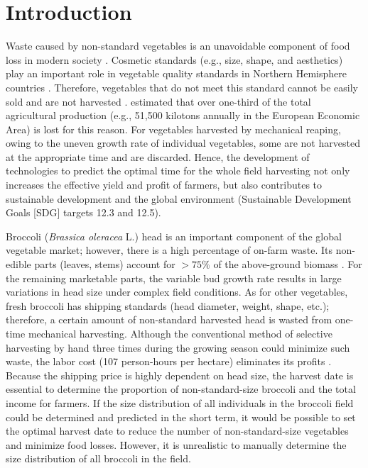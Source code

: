 \section{Introduction}

Waste caused by non-standard vegetables is an unavoidable component of food loss in modern society \citep{parfitt_food_2010,teuber_food_2016}. Cosmetic standards (e.g., size, shape, and aesthetics) play an important role in vegetable quality standards in Northern Hemisphere countries \citep{porter_avoidable_2018}. Therefore, vegetables that do not meet this standard cannot be easily sold and are not harvested \citep{garrone_opening_2014}. \citet{porter_avoidable_2018} estimated that over one-third of the total agricultural production (e.g., 51,500 kilotons annually in the European Economic Area) is lost for this reason. For vegetables harvested by mechanical reaping, owing to the uneven growth rate of individual vegetables, some are not harvested at the appropriate time and are discarded. Hence, the development of technologies to predict the optimal time for the whole field harvesting not only increases the effective yield and profit of farmers, but also contributes to sustainable development and the global environment (Sustainable Development Goals [SDG] targets 12.3 and 12.5).

Broccoli (\textit{Brassica oleracea} L.) head is an important component of the global vegetable market; however, there is a high percentage of on-farm waste. Its non-edible parts (leaves, stems) account for $> 75\%$ of the above-ground biomass \citep[Table~1]{fink_nitrogen_1999}. For the remaining marketable parts, the variable bud growth rate results in large variations in head size under complex field conditions. As for other vegetables, fresh broccoli has shipping standards (head diameter, weight, shape, etc.); therefore, a certain amount of non-standard harvested head is wasted from one-time mechanical harvesting. Although the conventional method of selective harvesting by hand three times during the growing season could minimize such waste, the labor cost (107 person-hours per hectare) eliminates its profits \citep{blok_effect_2021}. Because the shipping price is highly dependent on head size, the harvest date is essential to determine the proportion of non-standard-size broccoli and the total income for farmers. If the size distribution of all individuals in the broccoli field could be determined and predicted in the short term, it would be possible to set the optimal harvest date to reduce the number of non-standard-size vegetables and minimize food losses. However, it is unrealistic to manually determine the size distribution of all broccoli in the field.

